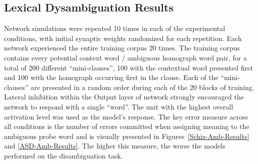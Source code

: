 \documentclass[man]{apa}
\begin{document}
\subsection{Lexical Dysambiguation Results}

Network simulations were repeated 10 times in each of the experimental conditions, with initial synaptic weights randomized for each repetition.  Each network experienced the entire training corpus 20 times.  The training corpus contains every potential context word / ambiguous homograph word pair, for a total of 200 different ``mini-clauses'', 100 with the contextual word presented first and 100 with the homograph occurring first in the clause.  Each of the ``mini-clauses'' are presented in a random order during each of the 20 blocks of training.  Lateral inhibition within the Output layer of network strongly encouraged the network to respond with a single ``word''.  The unit with the highest overall activation level was used as the model's response.  The key error measure across all conditions is the number of errors committed when assigning meaning to the ambiguous probe word and is visually presented in Figures~\ref{Schiz-Amb-Results} and \ref{ASD-Amb-Results}. The higher this measure, the worse the models performed on the disambiguation task.  
\end{document}
